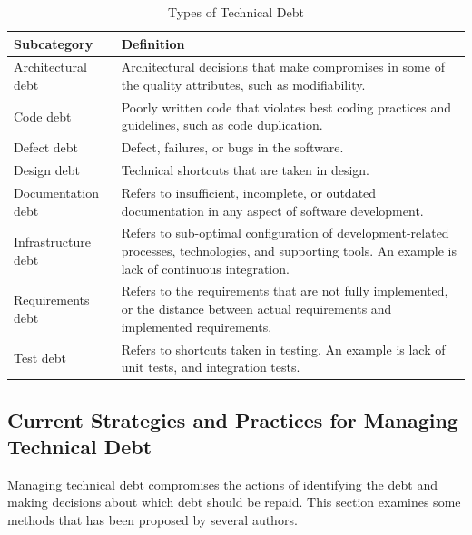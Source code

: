 {\begin{table}
	\centering
	\begin{tabular}{ | p{5cm} | p{8cm} |}
	\hline
	\textbf{Subcategory} & \textbf{Definition} \\ \hline
	Architectural debt\cite{li2015systematic,p8-codabux,foser076-brown} & Architectural decisions that make compromises in some of the quality attributes, such as modifiability. \\ \hline
	Code debt\cite{li2015systematic,foser076-brown,tom2013exploration} & Poorly written code that violates best coding practices and guidelines, such as code duplication. \\ \hline
	Defect debt\cite{li2015systematic,tom2013exploration} & Defect, failures, or bugs in the software. \\ \hline
	Design debt\cite{li2015systematic,Zazworka:2011:PDD:1985362.1985372,foser076-brown} & Technical shortcuts that are taken in design.\\ \hline
	Documentation debt\cite{li2015systematic,foser076-brown,Zazworka:2013:CSE:2460999.2461005} & Refers to insufficient, incomplete, or outdated documentation in any aspect of software development.\\ \hline
	Infrastructure debt\cite{li2015systematic,tom2013exploration,p8-codabux} & Refers to sub-optimal configuration of development-related processes, technologies, and supporting tools. An example is lack of continuous integration.\\ \hline
	Requirements debt\cite{li2015systematic,Zazworka:2013:CSE:2460999.2461005} & Refers to the requirements that are not fully implemented, or the distance between actual requirements and implemented requirements.\\ \hline
	Test debt\cite{li2015systematic,Zazworka:2013:CSE:2460999.2461005,foser076-brown} & Refers to shortcuts taken in testing. An example is lack of unit tests, and integration tests.\\
	\hline
	\end{tabular}
	\caption{Types of Technical Debt} \label{tab:subcategories}
\end{table}

\subsection{Current Strategies and Practices for Managing Technical Debt}
Managing technical debt compromises the actions of identifying the debt and making decisions about which debt should be repaid\cite{foser076-brown,krutchen,url-mcconnell}. This section examines some methods that has been proposed by several authors.

}
